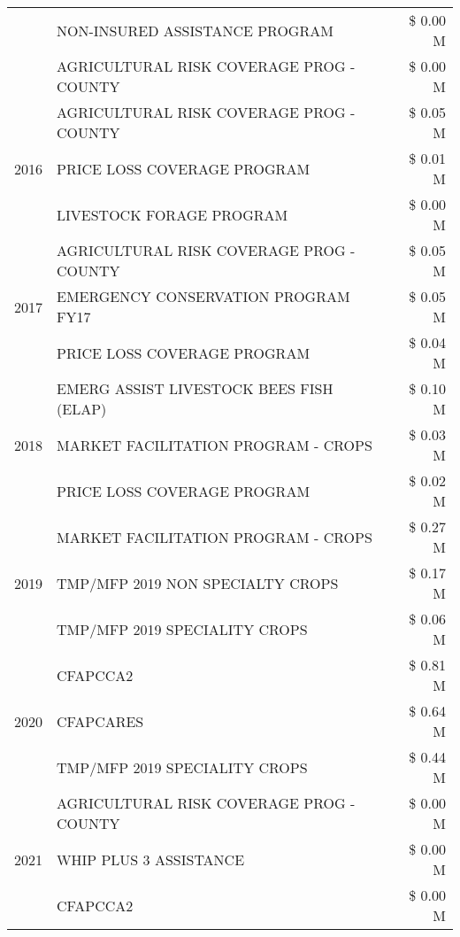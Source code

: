 \begin{tabular}{llr}
 & NON-INSURED ASSISTANCE PROGRAM & \$ 0.00 M \\
 & AGRICULTURAL RISK COVERAGE PROG - COUNTY & \$ 0.00 M \\
\cline{1-3}
\multirow[t]{3}{*}{2016} & AGRICULTURAL RISK COVERAGE PROG - COUNTY & \$ 0.05 M \\
 & PRICE LOSS COVERAGE PROGRAM & \$ 0.01 M \\
 & LIVESTOCK FORAGE PROGRAM & \$ 0.00 M \\
\cline{1-3}
\multirow[t]{3}{*}{2017} & AGRICULTURAL RISK COVERAGE PROG - COUNTY & \$ 0.05 M \\
 & EMERGENCY CONSERVATION PROGRAM FY17 & \$ 0.05 M \\
 & PRICE LOSS COVERAGE PROGRAM & \$ 0.04 M \\
\cline{1-3}
\multirow[t]{3}{*}{2018} & EMERG ASSIST LIVESTOCK BEES FISH (ELAP) & \$ 0.10 M \\
 & MARKET FACILITATION PROGRAM - CROPS & \$ 0.03 M \\
 & PRICE LOSS COVERAGE PROGRAM & \$ 0.02 M \\
\cline{1-3}
\multirow[t]{3}{*}{2019} & MARKET FACILITATION PROGRAM - CROPS & \$ 0.27 M \\
 & TMP/MFP 2019 NON SPECIALTY CROPS & \$ 0.17 M \\
 & TMP/MFP 2019 SPECIALITY CROPS & \$ 0.06 M \\
\cline{1-3}
\multirow[t]{3}{*}{2020} & CFAPCCA2 & \$ 0.81 M \\
 & CFAPCARES & \$ 0.64 M \\
 & TMP/MFP 2019 SPECIALITY CROPS & \$ 0.44 M \\
\cline{1-3}
\multirow[t]{3}{*}{2021} & AGRICULTURAL RISK COVERAGE PROG - COUNTY & \$ 0.00 M \\
 & WHIP PLUS 3 ASSISTANCE & \$ 0.00 M \\
 & CFAPCCA2 & \$ 0.00 M \\
\cline{1-3}
\bottomrule
\end{tabular}
